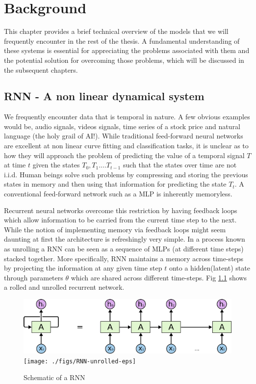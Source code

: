 \chapter{Background}
This chapter provides a brief technical overview of the models that we will frequently encounter in the rest of the thesis. A fundamental understanding of these systems is essential for appreciating the problems associated with them and the potential solution for overcoming those problems, which will be discussed in the subsequent chapters.

\section{RNN - A non linear dynamical system}
We frequently encounter data that is temporal in nature. A few obvious examples would  be, audio signals, videos signals, time series of a stock price and natural language (the holy grail of AI!). While traditional feed-forward neural networks are excellent at non linear curve fitting and classification tasks, it is unclear as to how they will approach the problem of predicting the value of a temporal signal $T$ at time $t$ given the states $T_{0}, T_{1}....T_{t-1}$ such that the states over time are not i.i.d. Human beings solve such problems by compressing and storing the previous states in memory and then using that information for predicting the state $T_t$. A conventional feed-forward network such as a MLP is inherently memoryless.

Recurrent neural networks overcome this restriction by having feedback loops which allow information to be carried from the current time step to the next. While the notion of implementing memory via feedback loops might seem daunting at first the architecture is refreshingly very simple. In a process known as unrolling a RNN can be seen as a sequence of MLPs (at different time steps) stacked together. More specifically, RNN maintains a memory across time-steps by projecting the information at any given time step $t$ onto a hidden(latent) state through parameters $\theta$ which are shared across different time-steps. Fig \ref{bck:rnn} shows a rolled and unrolled recurrent network.

\begin{figure}
	\begin{minipage}[t]{\textwidth}
		\ifpdf
		\includegraphics[width=\linewidth,keepaspectratio=true]{./figs/RNN-unrolled-pdf}
		\else
		\texttt{[image: ./figs/RNN-unrolled-eps]}
		\fi
		\caption{\small Schematic of a RNN \cite{olah}}
		\label{bck:rnn}
	\end{minipage}
\end{figure}

